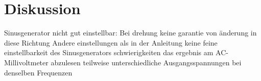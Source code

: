 \section{Diskussion}
\label{sec:Diskussion}
Sinusgenerator nicht gut einstellbar: Bei drehung keine garantie von änderung in diese Richtung
Andere einstellungen als in der Anleitung
keine feine einstellbarkeit des Sinusgenerators
schwierigkeiten das ergebnis am AC-Millivoltmeter abzulesen
teilweise unterschiedliche Ausgangsspannungen bei denselben Frequenzen